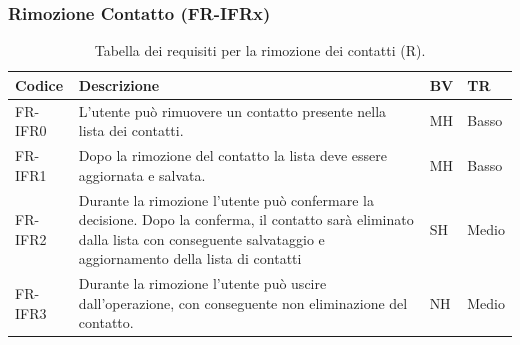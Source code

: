 \documentclass[a4paper,12pt]{article}
\begin{document}
    \subsubsection{Rimozione Contatto (FR-IFRx)}
    \begin{table}[H]
        \centering
        \begin{tabular}{|l|p{8cm}|l|l|}
            \hline
            \textbf{Codice} & \textbf{Descrizione} & \textbf{BV} & \textbf{TR} \\
            \hline
            FR-IFR0 & L'utente può rimuovere un contatto presente nella lista dei contatti. & MH & Basso \\
            \hline
            FR-IFR1 & Dopo la rimozione del contatto la lista deve essere aggiornata e salvata. & MH & Basso
            \\
            \hline
            FR-IFR2 & Durante la rimozione l'utente può confermare la decisione. Dopo la conferma, il contatto sarà eliminato dalla lista con conseguente salvataggio e aggiornamento della lista di contatti & SH & Medio
            \\
            \hline
            FR-IFR3 & Durante la rimozione l'utente può uscire dall'operazione, con conseguente non eliminazione del contatto. & NH & Medio
            \\
            \hline
        \end{tabular}
        \caption{Tabella dei requisiti per la rimozione dei contatti (R).}
    \end{table}
    \nopagebreak
\end{document}

